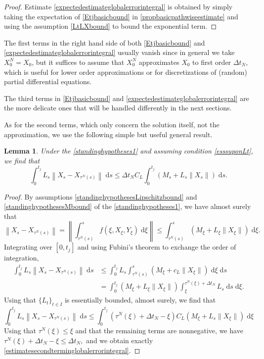 \documentclass[reqno,12pt]{amsart}
\theoremstyle{plain} %
\newtheorem{lemma}{Lemma}[section]
\theoremstyle{definition} %
\begin{document}
\begin{proof}
    Estimate \eqref{expectedestimateglobalerrorintegral} is obtained by simply taking the expectation of \eqref{Etjbasicbound} in \cref{propbasicpathwiseestimate} and using the assumption \eqref{LtLXbound} to bound the exponential term.
\end{proof}


The first terms in the right hand side of both \eqref{Etjbasicbound} and \eqref{expectedestimateglobalerrorintegral} usually vanish since in general we take $X_0^N = X_0$, but it suffices to assume that $X_0^N$ approximates $X_0$ to first order $\Delta t_N$, which is useful for lower order approximations or for discretizations of (random) partial differential equations.

The third terms in \eqref{Etjbasicbound} and \eqref{expectedestimateglobalerrorintegral} are the more delicate ones that will be handled differently in the next sections.

As for the second terms, which only concern the solution itself, not the approximation, we use the following simple but useful general result.

\begin{lemma}
    \label{lemestimatesecondterminglobalerror}
    Under the \cref{standinghypotheses1} and assuming condition \eqref{esssuponLt}, we find that
    \begin{equation}
        \label{estimatesecondterminglobalerrorintegral}
        \int_0^{t_j}L_s\left\|X_s - X_{\tau^N(s)}\right\| \;\mathrm{d}s \leq \Delta t_N C_L \int_0^{t_j} (M_s + L_s\|X_s\|) \;\mathrm{d}s.
    \end{equation}
\end{lemma}

\begin{proof}
    By assumptions \eqref{standinghypothesesLipschitzbound} and \eqref{standinghypothesesMbound} of the \cref{standinghypotheses1}, we have almost surely that
    \[
      \left\|X_s - X_{\tau^N(s)}\right\| = \left\|\int_{\tau^N(s)}^s f(\xi, X_\xi, Y_\xi)\;\mathrm{d}\xi\right\| \leq \int_{\tau^N(s)}^s (M_\xi + L_\xi\|X_\xi\|)\;\mathrm{d}\xi.
    \]
    Integrating over $[0, t_j]$ and using Fubini's theorem to exchange the order of integration,
    \begin{align*}
        \int_0^{t_j}L_s\left\|X_s - X_{\tau^N(s)}\right\| \;\mathrm{d}s & \leq \int_0^{t_j}L_s\int_{\tau^N(s)}^s (M_\xi + c_L\|X_\xi\|) \;\mathrm{d}\xi \;\mathrm{d}s \\
        & = \int_0^{t_j}(M_\xi + L_\xi\|X_\xi\|) \int_\xi^{\tau^N(\xi) + \Delta t_N} L_s\;\mathrm{d}s \;\mathrm{d}\xi.
    \end{align*}
    Using that $\{L_t\}_{t\in I}$ is essentially bounded, almost surely, we find that
    \[
        \int_0^{t_j}L_s\left\|X_s - X_{\tau^N(s)}\right\| \;\mathrm{d}s \leq \int_0^{t_j} (\tau^N(\xi) + \Delta t_N - \xi) C_L(M_\xi + L_s\|X_\xi\|) \;\mathrm{d}\xi
    \]
    Using that $\tau^N(\xi) \leq \xi$ and that the remaining terms are nonnegative, we have $\tau^N(\xi) + \Delta t_N - \xi \leq \Delta t_N,$ and we obtain exactly \eqref{estimatesecondterminglobalerrorintegral}.
\end{proof}
\end{document}
